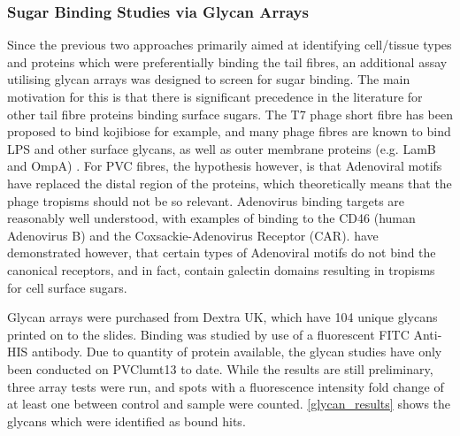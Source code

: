 \subsubsection{Sugar Binding Studies via Glycan Arrays}
Since the previous two approaches primarily aimed at identifying cell/tissue types and proteins which were preferentially binding the tail fibres, an additional assay utilising glycan arrays was designed to screen for sugar binding. The main motivation for this is that there is significant precedence in the literature for other tail fibre proteins binding surface sugars. The T7 phage short fibre has been proposed to bind kojibiose for example, and many phage fibres are known to bind LPS and other surface glycans, \citep{Simpson2015, Le2013} as well as outer membrane proteins (e.g. LamB and OmpA) \citep{Chatterjee2012, Morona1984}. For PVC fibres, the hypothesis however, is that Adenoviral motifs have replaced the distal region of the proteins, which theoretically means that the phage tropisms should not be so relevant. Adenovirus binding targets are reasonably well understood, with examples of binding to the CD46 (human Adenovirus B) \citep{Gaggar2003} and the Coxsackie-Adenovirus Receptor (CAR). \cite{Guardado-Calvo2010} have demonstrated however, that certain types of Adenoviral motifs do not bind the canonical receptors, and in fact, contain galectin domains resulting in tropisms for cell surface sugars.

Glycan arrays were purchased from Dextra UK, which have 104 unique glycans printed on to the slides. Binding was studied by use of a fluorescent FITC Anti-HIS antibody. Due to quantity of protein available, the glycan studies have only been conducted on PVClumt13 to date. While the results are still preliminary, three array tests were run, and spots with a fluorescence intensity fold change of at least one between control and sample were counted. \vref{glycan_results} shows the glycans which were identified as bound hits.
\clearpage

